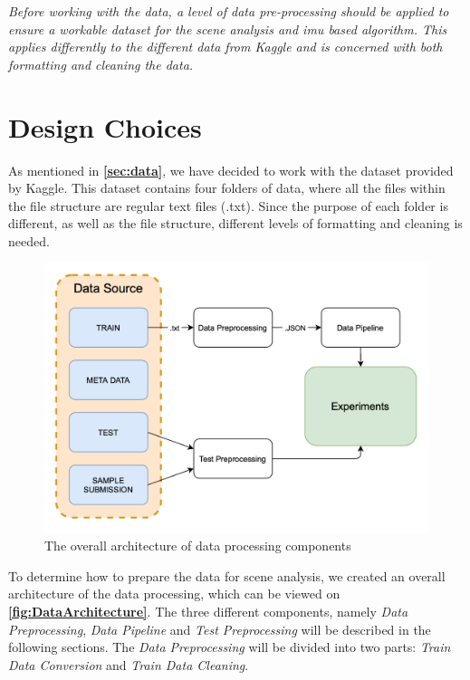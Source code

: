 \textit{Before working with the data, a level of data pre-processing should be applied to ensure a workable dataset for the scene analysis and \gls{imu} based algorithm. This applies differently to the different data from Kaggle and is concerned with both formatting and cleaning the data.}

\section{Design Choices}
As mentioned in \textbf{\autoref{sec:data}}, we have decided to work with the dataset provided by Kaggle. This dataset contains four folders of data, where all the files within the file structure are regular text files (.txt). Since the purpose of each folder is different, as well as the file structure, different levels of formatting and cleaning is needed.

\begin{figure}[H]
    \centering
    \includegraphics[scale=0.35]{Images/DataStandard/DataFlow.png}
    \caption{The overall architecture of data processing components}
    \label{fig:DataArchitecture}
\end{figure}

To determine how to prepare the data for scene analysis, we created an overall architecture of the data processing, which can be viewed on \textbf{\autoref{fig:DataArchitecture}}. The three different components, namely \textit{Data Preprocessing}, \textit{Data Pipeline} and \textit{Test Preprocessing} will be described in the following sections. The \textit{Data Preprocessing} will be divided into two parts: \textit{Train Data Conversion} and \textit{Train Data Cleaning}.

